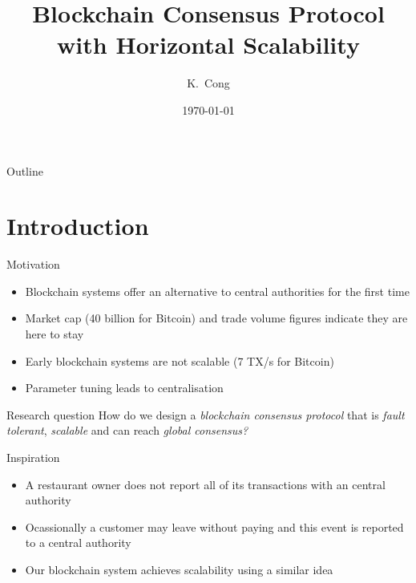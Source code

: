 \documentclass{beamer}
\title{Blockchain Consensus Protocol with Horizontal Scalability}
\author{K.~Cong}
\institute[Delft University of Technology] %
{
  Faculty of Electrical Engineering, Mathematics and Computer Science\\
  Delft University of Technology}
\date{\today}
\begin{document}
\begin{frame}
  \titlepage

\end{frame}

\begin{frame}{Outline}
  \tableofcontents
\end{frame}

\section{Introduction}
\begin{frame}{Motivation}
  \begin{itemize}
    \item Blockchain systems offer an alternative to central authorities for the first time
    \item Market cap (40 billion for Bitcoin) and trade volume figures indicate they are here to stay
    \item Early blockchain systems are not scalable (7 TX/s for Bitcoin)
    \item Parameter tuning leads to centralisation
  \end{itemize}
\end{frame}

\begin{frame}{Research question}
    How do we design a \emph{blockchain consensus protocol} that is \emph{fault tolerant},
    \emph{scalable} and can reach \emph{global consensus?}
\end{frame}

\begin{frame}{Inspiration}
  \begin{itemize}
    \item A restaurant owner does not report all of its transactions with an central authority
    \item Ocassionally a customer may leave without paying and this event is reported to a central authority
    \item Our blockchain system achieves scalability using a similar idea
  \end{itemize}
\end{frame}
\end{document}
